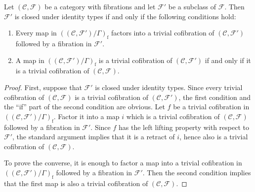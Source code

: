\documentclass[reqno]{amsart}
\theoremstyle{definition}
\theoremstyle{remark}
\newcommand{\fs}[1]{\mathrm{#1}}
\newcommand{\scat}[1]{\mathcal{#1}}
\newcommand{\Fib}{\mathcal{F}}
\numberwithin{figure}{section}
\begin{document}
\begin{lem}[subfib]
Let $(\scat{C},\Fib)$ be a category with fibrations and let $\Fib'$ be a subclass of $\Fib$.
Then $\Fib'$ is closed under identity types if and only if the following conditions hold:
\begin{enumerate}
\item \label{it:subfib-factor} Every map in $((\scat{C},\Fib')/\Gamma)_\fs{f}$ factors into a trivial cofibration of $(\scat{C},\Fib')$ followed by a fibration in $\Fib'$.
\item \label{it:subfib-we} A map in $((\scat{C},\Fib')/\Gamma)_\fs{f}$ is a trivial cofibration of $(\scat{C},\Fib')$ if and only if it is a trivial cofibration of $(\scat{C},\Fib)$.
\end{enumerate}
\end{lem}
\begin{proof}
First, suppose that $\Fib'$ is closed under identity types.
Since every trivial cofibration of $(\scat{C},\Fib)$ is a trivial cofibration of $(\scat{C},\Fib')$, the first condition and the ``if'' part of the second condition are obvious.
Let $f$ be a trivial cofibration in $((\scat{C},\Fib')/\Gamma)_\fs{f}$.
Factor it into a map $i$ which is a trivial cofibration of $(\scat{C},\Fib)$ followed by a fibration in $\Fib'$.
Since $f$ has the left lifting property with respect to $\Fib'$, the standard argument implies that it is a retract of $i$, hence also is a trivial cofibration of $(\scat{C},\Fib)$.

To prove the converse, it is enough to factor a map into a trivial cofibration in $((\scat{C},\Fib')/\Gamma)_\fs{f}$ followed by a fibration in $\Fib'$.
Then the second condition implies that the first map is also a trivial cofibration of $(\scat{C},\Fib)$.
\end{proof}
\end{document}

